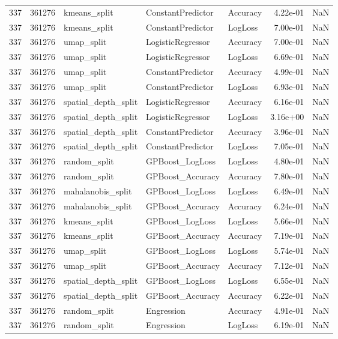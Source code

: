 \begin{tabular}{rrlllrr}
337 & 361276 & kmeans\_split & ConstantPredictor & Accuracy & 4.22e-01 & NaN \\
337 & 361276 & kmeans\_split & ConstantPredictor & LogLoss & 7.00e-01 & NaN \\
337 & 361276 & umap\_split & LogisticRegressor & Accuracy & 7.00e-01 & NaN \\
337 & 361276 & umap\_split & LogisticRegressor & LogLoss & 6.69e-01 & NaN \\
337 & 361276 & umap\_split & ConstantPredictor & Accuracy & 4.99e-01 & NaN \\
337 & 361276 & umap\_split & ConstantPredictor & LogLoss & 6.93e-01 & NaN \\
337 & 361276 & spatial\_depth\_split & LogisticRegressor & Accuracy & 6.16e-01 & NaN \\
337 & 361276 & spatial\_depth\_split & LogisticRegressor & LogLoss & 3.16e+00 & NaN \\
337 & 361276 & spatial\_depth\_split & ConstantPredictor & Accuracy & 3.96e-01 & NaN \\
337 & 361276 & spatial\_depth\_split & ConstantPredictor & LogLoss & 7.05e-01 & NaN \\
337 & 361276 & random\_split & GPBoost\_LogLoss & LogLoss & 4.80e-01 & NaN \\
337 & 361276 & random\_split & GPBoost\_Accuracy & Accuracy & 7.80e-01 & NaN \\
337 & 361276 & mahalanobis\_split & GPBoost\_LogLoss & LogLoss & 6.49e-01 & NaN \\
337 & 361276 & mahalanobis\_split & GPBoost\_Accuracy & Accuracy & 6.24e-01 & NaN \\
337 & 361276 & kmeans\_split & GPBoost\_LogLoss & LogLoss & 5.66e-01 & NaN \\
337 & 361276 & kmeans\_split & GPBoost\_Accuracy & Accuracy & 7.19e-01 & NaN \\
337 & 361276 & umap\_split & GPBoost\_LogLoss & LogLoss & 5.74e-01 & NaN \\
337 & 361276 & umap\_split & GPBoost\_Accuracy & Accuracy & 7.12e-01 & NaN \\
337 & 361276 & spatial\_depth\_split & GPBoost\_LogLoss & LogLoss & 6.55e-01 & NaN \\
337 & 361276 & spatial\_depth\_split & GPBoost\_Accuracy & Accuracy & 6.22e-01 & NaN \\
337 & 361276 & random\_split & Engression & Accuracy & 4.91e-01 & NaN \\
337 & 361276 & random\_split & Engression & LogLoss & 6.19e-01 & NaN \\

\end{tabular}

